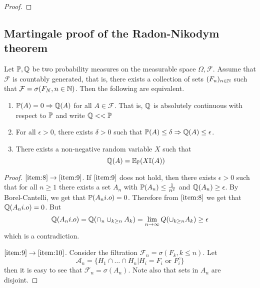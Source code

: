 \begin{proof}
\end{proof}


\subsection{Martingale proof of the Radon-Nikodym theorem}
\label{sec:mart-proof-radon}

Let $\Prob, \Q$ be two probability measures on the measurable space
$\Omega, \mathcal{F}$.  Assume that $\mathcal{F}$ is countably
generated, that is, there exists a collection of sets $(F_{n})_{n \in
  \mathbb{N}}$ such that $\mathcal{F} = \sigma(F_{N}, n \in \mathbb{N})$. Then the
following are equivalent.
\begin{enumerate}
\item \label{item:8} $\Prob{A} = 0 \Rightarrow  \Q{A}$ for all $A \in \mathcal{F}$.
  That is, $\Q$ is absolutely continuous with respect to $\Prob$ and
  write $\Q << \Prob$
\item \label{item:9} For all $\epsilon > 0$, there exists $\delta > 0$ such that
  $\Prob{A} \leq \delta \Rightarrow \Q{A} \leq \epsilon$.
\item \label{item:10} There exists a non-negative random variable $X$ such that
  \begin{equation}
    \label{eq:50}
    \Q{A} = \E{X\I{A}}{\Prob}
  \end{equation}
\end{enumerate}

\begin{proof}
  $\ref{item:8} \rightarrow \ref{item:9}$.  If $\ref{item:9}$ does not
  hold, then there exists $\epsilon > 0$ such that for all $n \geq 1$
  there exists a set $A_{n}$ with $\Prob{A_n} \leq \frac{1}{n^{2}}$
  and $\Q{A_{n}} \geq \epsilon$.  By Borel-Cantelli, we get that
  $\Prob{A_{n} i.o} = 0$.  Therefore from $\ref{item:8}$ we get that
  $\Q{A_{n} i.o} = 0$.  But
  \begin{equation}
    \label{eq:51}
    \Q{A_{n} i.o} = \Q{\cap_{n} \cup_{k \geq n} A_{k}} = \lim_{n
      \rightarrow \infty} Q(\cup_{k \geq n} A_{k}) \geq \epsilon
  \end{equation} which is a contradiction.


  $\ref{item:9} \rightarrow \ref{item:10}$. Consider the filtration
  $\mathcal{F}_{n} = \sigma(F_{k}, k \leq n)$.  Let
  \begin{equation}
    \label{eq:52}
    \mathcal{A}_{n} = \{ H_{1} \cap \dots \cap H_{n} | H_{i} = F_{i}
    \text{ or } F_{i}^{c} \}
  \end{equation} then it is easy to see that $\mathcal{F}_{n} =
  \sigma(A_{n})$.  Note also that sets in $A_{n}$ are disjoint.

\end{proof}

